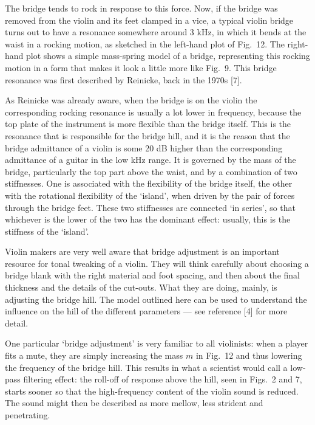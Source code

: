   The bridge tends to rock in response to this force. Now, if the bridge was 
  removed from the violin and its feet clamped in a vice, a typical violin 
  bridge turns out to have a resonance somewhere around 3 kHz, in which it 
  bends at the waist in a rocking motion, as sketched in the left-hand plot of 
  Fig.\ 12. The right-hand plot shows a simple mass-spring model of a bridge, 
  representing this rocking motion in a form that makes it look a little more 
  like Fig.\ 9. This bridge resonance was first described by Reinicke, back in 
  the 1970s [7]. 



  As Reinicke was already aware, when the bridge is on the violin the 
  corresponding rocking resonance is usually a lot lower in frequency, because 
  the top plate of the instrument is more flexible than the bridge itself. This 
  is the resonance that is responsible for the bridge hill, and it is the 
  reason that the bridge admittance of a violin is some 20 dB higher than the 
  corresponding admittance of a guitar in the low kHz range. It is governed by 
  the mass of the bridge, particularly the top part above the waist, and by a 
  combination of two stiffnesses. One is associated with the flexibility of the 
  bridge itself, the other with the rotational flexibility of the `island', 
  when driven by the pair of forces through the bridge feet. These two 
  stiffnesses are connected `in series', so that whichever is the lower of the 
  two has the dominant effect: usually, this is the stiffness of the `island'. 

  Violin makers are very well aware that bridge adjustment is an important 
  resource for tonal tweaking of a violin. They will think carefully about 
  choosing a bridge blank with the right material and foot spacing, and then 
  about the final thickness and the details of the cut-outs. What they are 
  doing, mainly, is adjusting the bridge hill. The model outlined here can be 
  used to understand the influence on the hill of the different parameters --- 
  see reference [4] for more detail. 

  One particular `bridge adjustment' is very familiar to all violinists: when a 
  player fits a mute, they are simply increasing the mass $m$ in Fig.\ 12 and 
  thus lowering the frequency of the bridge hill. This results in what a 
  scientist would call a low-pass filtering effect: the roll-off of response 
  above the hill, seen in Figs.\ 2 and 7, starts sooner so that the 
  high-frequency content of the violin sound is reduced. The sound might then 
  be described as more mellow, less strident and penetrating. 


